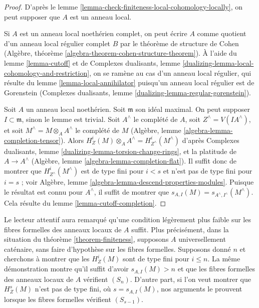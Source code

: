 \begin{proof}
D'après le lemme \ref{lemma-check-finiteness-local-cohomology-locally}, on peut supposer que $A$ est un anneau local.

\medskip\noindent
Si $A$ est un anneau local noethérien complet, on peut écrire $A$ comme quotient d'un anneau local régulier complet $B$ par le théorème de structure de Cohen (Algèbre, théorème \ref{algebra-theorem-cohen-structure-theorem}). À l'aide du lemme \ref{lemma-cutoff} et de Complexes dualisants, lemme \ref{dualizing-lemma-local-cohomology-and-restriction}, on se ramène au cas d'un anneau local régulier, qui résulte du lemme \ref{lemma-local-annihilator} puisqu'un anneau local régulier est de Gorenstein (Complexes dualisants, lemme \ref{dualizing-lemma-regular-gorenstein}).

\medskip\noindent
Soit $A$ un anneau local noethérien. Soit $\mathfrak m$ son idéal maximal. On peut supposer $I \subset \mathfrak m$, sinon le lemme est trivial. Soit $A^\wedge$ le complété de $A$, soit $Z^\wedge = V(IA^\wedge)$, et soit $M^\wedge = M \otimes_A A^\wedge$ le complété de $M$ (Algèbre, lemme \ref{algebra-lemma-completion-tensor}). Alors $H^i_Z(M) \otimes_A A^\wedge = H^i_{Z^\wedge}(M^\wedge)$ d'après Complexes dualisants, lemme \ref{dualizing-lemma-torsion-change-rings}, et la platitude de $A \to A^\wedge$ (Algèbre, lemme \ref{algebra-lemma-completion-flat}). Il suffit donc de montrer que $H^i_{Z^\wedge}(M^\wedge)$ est de type fini pour $i < s$ et n'est pas de type fini pour $i = s$ ; voir Algèbre, lemme \ref{algebra-lemma-descend-properties-modules}. Puisque le résultat est connu pour $A^\wedge$, il suffit de montrer que $s_{A, I}(M) = s_{A^\wedge, I^\wedge}(M^\wedge)$. Cela résulte du lemme \ref{lemma-cutoff-completion}.
\end{proof}

\begin{remark}
\label{remark-astute-reader}
Le lecteur attentif aura remarqué qu'une condition légèrement plus faible sur les fibres formelles des anneaux locaux de $A$ suffit. Plus précisément, dans la situation du théorème \ref{theorem-finiteness}, supposons $A$ universellement caténaire, sans faire d'hypothèse sur les fibres formelles. Supposons donné $n$ et cherchons à montrer que les $H^i_Z(M)$ sont de type fini pour $i \leq n$. La même démonstration montre qu'il suffit d'avoir $s_{A, I}(M) > n$ et que les fibres formelles des anneaux locaux de $A$ vérifient $(S_n)$. D'autre part, si l'on veut montrer que $H^s_Z(M)$ n'est pas de type fini, où $s = s_{A, I}(M)$, nos arguments le prouvent lorsque les fibres formelles vérifient $(S_{s - 1})$.
\end{remark}







